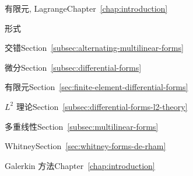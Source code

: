 \par\noindent\hspace*{0em}\label{index:finite-elements-lagrange}{有限元, Lagrange}\quad Chapter~\ref{chap:introduction}

\par\noindent\hspace*{0em}\label{index:form}{形式}

\par\noindent\hspace*{1em}\label{index:form-alternating}{交错}\quad Section~\ref{subsec:alternating-multilinear-forms}

\par\noindent\hspace*{1em}\label{index:form-differential}{微分}\quad Section~\ref{subsec:differential-forms}

\par\noindent\hspace*{2em}\label{index:form-differential-finite-element}{有限元}\quad Section~\ref{sec:finite-element-differential-forms}

\par\noindent\hspace*{2em}\label{index:form-differential-l-2-theory}{$L^2$ 理论}\quad Section~\ref{subsec:differential-forms-l2-theory}

\par\noindent\hspace*{1em}\label{index:form-multilinear}{多重线性}\quad Section~\ref{subsec:multilinear-forms}

\par\noindent\hspace*{1em}\label{index:form-whitney}{Whitney}\quad Section~\ref{sec:whitney-forms-de-rham}

\par\noindent\hspace*{0em}\label{index:galerkin-method}{Galerkin 方法}\quad Chapter~\ref{chap:introduction}


